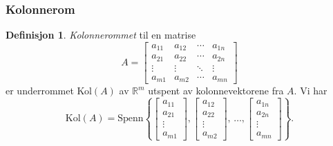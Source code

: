 \documentclass[11pt]{article}
\theoremstyle{definition}
\newtheorem{mindef}{Definisjon}[section]
\newenvironment{fmindef}
{\begin{mdframed}[style=minstil]\begin{mindef}}
		{\end{mindef}\end{mdframed}}
\theoremstyle{definition}
\theoremstyle{definition}
\theoremstyle{definition}
\theoremstyle{definition}
\theoremstyle{definition}
\begin{document}
		\newpage
		
		\subsubsection{Kolonnerom}
		
		\begin{fmindef}
			\textit{Kolonnerommet} til en matrise 
			\[A=\left[\begin{array}{cccc} 
			a_{11} & a_{12} & \cdots & a_{1n} \\
			a_{21} & a_{22} & \cdots & a_{2n} \\
			\vdots & \vdots & \ddots & \vdots \\
			a_{m1} & a_{m2} & \cdots & a_{mn}
			\end{array} \right]\]
			er underrommet Kol\((A)\) av \(\mathbb{R}^m \) utspent av kolonnevektorene fra \(A\). Vi har 
			\[\text{Kol}(A)=\text{Spenn}\left\lbrace \left[\begin{array}{c} 
			a_{11} \\
			a_{21} \\
			\vdots \\
			a_{m1}
			\end{array} \right],
			\left[\begin{array}{c} 
			a_{12} \\
			a_{22} \\
			\vdots \\
			a_{m2}
			\end{array} \right],
			\,\ldots,
			\left[\begin{array}{c} 
			a_{1n} \\
			a_{2n} \\
			\vdots \\
			a_{mn}
			\end{array} \right]
			 \right\rbrace.  \]
		\end{fmindef}
		
\end{document}
